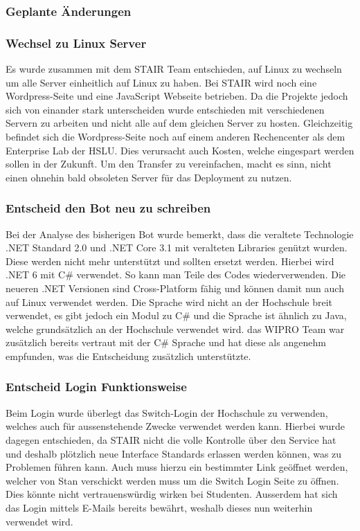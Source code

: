 \documentclass[a4paper, table]{article}
\begin{document}
\subsubsection{Geplante Änderungen}

\subsubsection*{Wechsel zu Linux Server}

Es wurde zusammen mit dem STAIR Team entschieden,
auf Linux zu wechseln um alle Server einheitlich auf Linux zu haben.
Bei STAIR wird noch eine Wordpress-Seite und eine JavaScript Webseite betrieben.
Da die Projekte jedoch sich von einander stark unterscheiden wurde entschieden mit verschiedenen Servern zu arbeiten und nicht alle auf dem gleichen Server zu hosten.
Gleichzeitig befindet sich die Wordpress-Seite noch auf einem anderen Rechencenter als dem Enterprise Lab der HSLU.
Dies verursacht auch Kosten, welche eingespart werden sollen in der Zukunft.
Um den Transfer zu vereinfachen, macht es sinn, nicht einen ohnehin bald obsoleten Server für das Deployment zu nutzen.

\subsubsection*{Entscheid den Bot neu zu schreiben}

Bei der Analyse des bisherigen Bot wurde bemerkt, dass die veraltete Technologie .NET Standard 2.0 und .NET Core 3.1 mit veralteten Libraries genützt wurden.
Diese werden nicht mehr unterstützt und sollten ersetzt werden.
Hierbei wird .NET 6 mit C\# verwendet.
So kann man Teile des Codes wiederverwenden.
Die neueren .NET Versionen sind Cross-Platform fähig und können damit nun auch auf Linux verwendet werden.\autocite{de_george_installieren_nodate}
Die Sprache wird nicht an der Hochschule breit verwendet, es gibt jedoch ein Modul zu C\#\autocite{}  und die Sprache ist ähnlich zu Java,
welche grundsätzlich an der Hochschule verwendet wird. 
das WIPRO Team war zusätzlich bereits vertraut mit der C\# Sprache und hat diese als angenehm empfunden, was die Entscheidung zusätzlich unterstützte.

\subsubsection*{Entscheid Login Funktionsweise}
Beim Login wurde überlegt das Switch-Login der Hochschule zu verwenden, welches auch für aussenstehende Zwecke verwendet werden kann.
Hierbei wurde dagegen entschieden, da STAIR nicht die volle Kontrolle über den Service hat und deshalb plötzlich neue Interface Standards erlassen werden können, was zu Problemen führen kann.
Auch muss hierzu ein bestimmter Link geöffnet werden, welcher von Stan verschickt werden muss um die Switch Login Seite zu öffnen.
Dies könnte nicht vertrauenswürdig wirken bei Studenten.
Ausserdem hat sich das Login mittels E-Mails bereits bewährt, weshalb dieses nun weiterhin verwendet wird.
\end{document}
